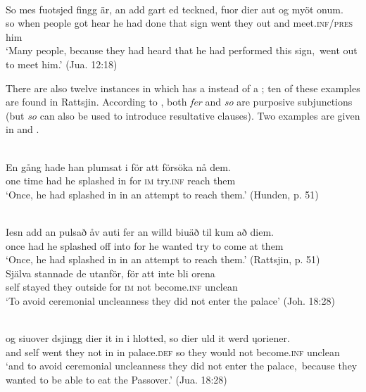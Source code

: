 \documentclass[output=paper]{langscibook}
\begin{document}
\ex {}\label{ex:kalm:19b}\\
\gll So mes fuotsjed fingg är, an add gart ed teckned, fuor dier aut og myöt onum.\\
so when people got hear he had done that sign went they out and meet.\textsc{inf/pres} him\\
\glt ‘Many people, because they had heard that he had performed this sign,{~}went out to meet him.’ (Jua. 12:18)
\z 
\z 


There are also twelve instances in which  has a  instead of a ; ten of these examples are found in Rattsjin. According to \citet[491]{AkerbergNystrom2012}, both \textit{fer} and \textit{so} are purposive subjunctions (but \textit{so} can also be used to introduce resultative clauses). Two examples are given in  and .  

\ea
\label{ex:kalm:20}
\ea {}\label{ex:kalm:20a}\\
\gll En gång hade han plumsat i för att försöka nå dem.\\
one time had he splashed in for \textsc{im} try.\textsc{inf} reach them\\ 
\glt ‘Once, he had splashed in in an attempt to reach them.’ (Hunden, p. 51)

\ex {}\label{ex:kalm:20b}\\
\gll Iesn add an pulsað åv auti fer an willd biuäð til kum að diem.\\
once had he splashed off into for he wanted try to come at them\\
\glt ‘Once, he had splashed in in an attempt to reach them.’ (Rattsjin, p. 51)
\z 
\ex
\label{ex:kalm:21}
\ea {}\label{ex:kalm:21a}\\ 
\gll Själva stannade de utanför, för att inte bli orena\\
self stayed they outside for \textsc{im} not become.\textsc{inf} unclean\\
\glt ‘To avoid ceremonial uncleanness they did not enter the palace’ (Joh. 18:28)

\ex {}\label{ex:kalm:21b}\\
\gll og siuover dsjingg dier it in i hlotted, so dier uld it werd \k{u}oriener.\\
and self went they not in in palace.\textsc{def} so they would not become.\textsc{inf} unclean\\
\glt ‘and to avoid ceremonial uncleanness they did not enter the palace,{~}because they wanted to be able to eat the Passover.’ (Jua. 18:28)
\z 
\z\largerpage[2]
\end{document}
